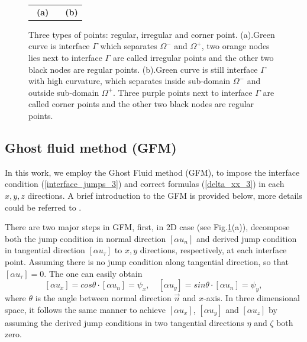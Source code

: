 \documentclass[dissertation]{uathesis}
\begin{document}
\begin{body}
\begin{figure}[!ht]
\begin{center}
{\begin{tabular}{ccc}
				\ \textbf{(a)} & \quad & \textbf{(b)}
		\end{tabular}}
	\end{center}
	\caption{Three types of points: regular, irregular and corner point. 
		(a).Green curve is interface $\Gamma$ which separates $\Omega^{-}$ and $\Omega^{+}$, two orange nodes lies next to interface $\Gamma$ are called irregular points and the other two black nodes are regular points.
		(b).Green curve is still interface $\Gamma$ with high curvature, which separates inside sub-domain $\Omega^{-}$ and outside sub-domain $\Omega^{+}$. Three purple points next to interface $\Gamma$ are called corner points and the other two black nodes are regular points. }
	\label{fig:irregular and corner points_3}
\end{figure}
%
\subsection{Ghost fluid method (GFM)}
In this work, we employ the Ghost Fluid method (GFM), to impose the interface condition (\ref{interface_jumps_3}) and correct formulas (\ref{delta_xx_3}) in each $x, y, z$ directions. A brief introduction to the GFM is provided below, more details could be referred to \cite{fedkiw1999non}. 

There are two major steps in GFM, first, in 2D case (see Fig.\ref{fig:irregular and corner points_3}(a)), decompose both the jump condition in normal direction $[\alpha u_n]$ and derived jump condition in tangential direction $[\alpha u_\tau]$ to $x, y$ directions, respectively, at each interface point. Assuming there is no jump condition along tangential direction, so that $[\alpha u_\tau] = 0$. The one can easily obtain  
%
\begin{equation}\label{GFM_jump_3}
[\alpha u_x] = cos\theta \cdot [\alpha u_n] = \psi_x, \quad [\alpha u_y] = sin\theta \cdot [\alpha u_n] = \psi_y, 
\end{equation}
%
where $\theta$ is the angle between normal direction $\vec{n}$ and $x$-axis. In three dimensional space, it follows the same manner to achieve $[\alpha u_x]$, $[\alpha u_y]$ and $[\alpha u_z]$ by assuming the derived jump conditions in two tangential directions $\eta$ and $\zeta$ both zero.


\end{body}
\end{document}
